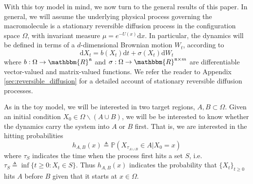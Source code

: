 \documentclass[english, aip, jcp, priprint, graphicx,floatfix]{revtex4-1}
\theoremstyle{plain}
\theoremstyle{definition}
\theoremstyle{plain}
\begin{document}
With this toy model in mind, we now turn to the general results of this paper. In general, we will assume the underlying physical process governing the macromolecule is a stationary reversible diffusion process in the configuration space $\Omega$, with invariant
measure ${\mu}= e^{- U (x)} \mathrm{d} x$.  In particular, the dynamics will be defined in terms of a $d$-dimensional Brownian motion $W_t$, according to 
\begin{equation}\label{equ:general_sde}\mathrm{d} X_t = b (X_t) \mathrm{d} t + \sigma (X_t) \mathrm{d} W_t \end{equation}
where $b: \Omega \rightarrow \mathbbm{R}^\dimension$ and $\sigma :
\Omega \rightarrow \mathbbm{R}^{\dimension \times m}$ are differentiable vector-valued
and matrix-valued functions.  We refer the reader to Appendix \ref{sec:reversible_diffusion} for a detailed account of stationary reversible diffusion processes.

As in the toy model, we will be interested in two target regions, $A,B\subset \Omega$.  Given an initial condition $X_0\in \Omega \backslash (A\cup B)$, we will be be interested to know whether the dynamics carry the system into $A$ or $B$ first.  That is, we are interested in the hitting probabilities
\[ h_{A, B}(x) \triangleq \mathbb{P}(X_{\tau_{A\cup B}}\in A|X_0=x)\]
where $\tau_S$ indicates the time when the process first hits a set $S$, i.e. $\tau_S \triangleq \inf \{ t \geqslant 0 : X_t \in S \}$.  Thus $h_{A,B}(x)$ indicates the probability that $\{X_t\}_{t \geq 0}$ hits $A$ before $B$ given that it starts at $x\in\Omega$. 
\end{document}
